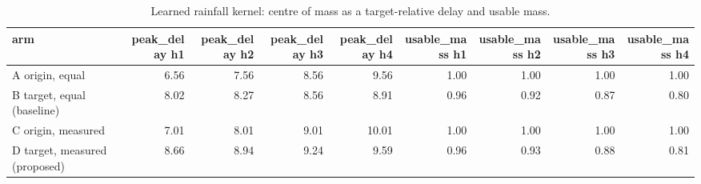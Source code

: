 \begin{table}[t]
\centering
\small
\caption{Learned rainfall kernel: centre of mass as a target-relative delay and usable mass.}
\label{tab:rainfall-kernel-summary}
\begin{tabular}{lrrrrrrrr}
\toprule
arm & peak\_delay h1 & peak\_delay h2 & peak\_delay h3 & peak\_delay h4 & usable\_mass h1 & usable\_mass h2 & usable\_mass h3 & usable\_mass h4 \\
\midrule
A origin, equal & 6.56 & 7.56 & 8.56 & 9.56 & 1.00 & 1.00 & 1.00 & 1.00 \\
B target, equal (baseline) & 8.02 & 8.27 & 8.56 & 8.91 & 0.96 & 0.92 & 0.87 & 0.80 \\
C origin, measured & 7.01 & 8.01 & 9.01 & 10.01 & 1.00 & 1.00 & 1.00 & 1.00 \\
D target, measured (proposed) & 8.66 & 8.94 & 9.24 & 9.59 & 0.96 & 0.93 & 0.88 & 0.81 \\
\bottomrule
\end{tabular}
\end{table}
